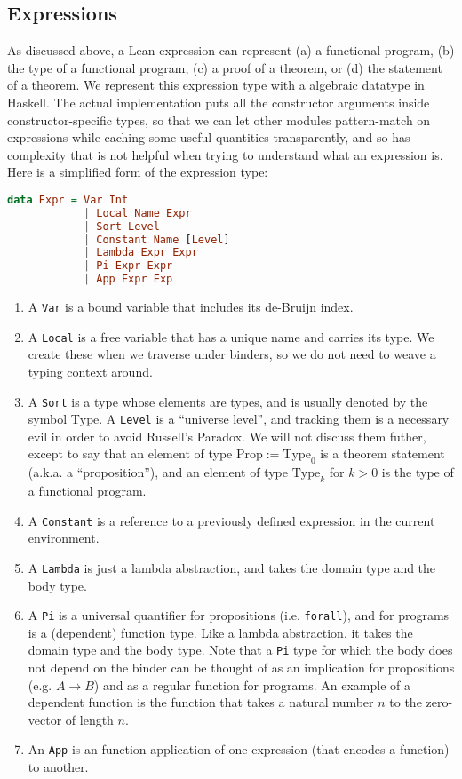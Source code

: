 \documentclass{article}
\begin{document}
\begin{spacing}{1.1}
\subsection{Expressions}
As discussed above, a Lean expression can represent (a) a functional program, (b) the type of a functional program, (c) a proof of a theorem, or (d) the statement of a theorem. We represent this expression type with a algebraic datatype in Haskell. The actual implementation puts all the constructor arguments inside constructor-specific types, so that we can let other modules pattern-match on expressions while caching some useful quantities transparently, and so has complexity that is not helpful when trying to understand what an expression is.  Here is a simplified form of the expression type:
\begin{lstlisting}[language=Haskell]
  data Expr = Var Int
            | Local Name Expr
            | Sort Level
            | Constant Name [Level]
            | Lambda Expr Expr
            | Pi Expr Expr
            | App Expr Exp
\end{lstlisting}
\begin{enumerate}
  \item A \lstinline{Var} is a bound variable that includes its de-Bruijn index.
  \item A \lstinline{Local} is a free variable that has a unique name and carries its type. We create these when we traverse under binders, so we do not need to weave a typing context around.
  \item A \lstinline{Sort} is a type whose elements are types, and is usually denoted by the symbol \( \mathrm{Type} \). A \lstinline{Level} is a ``universe level'', and tracking them is a necessary evil in order to avoid Russell's Paradox. We will not discuss them futher, except to say that an element of type \( \mathrm{Prop} := \mathrm{Type}_0 \) is a theorem statement (a.k.a. a ``proposition''), and an element of type \( \mathrm{Type}_k \) for \( k > 0 \) is the type of a functional program.
  \item A \lstinline{Constant} is a reference to a previously defined expression in the current environment.
  \item A \lstinline{Lambda} is just a lambda abstraction, and takes the domain type and the body type.
  \item A \lstinline{Pi} is a universal quantifier for propositions (i.e. \lstinline{forall}), and for programs is a (dependent) function type. Like a lambda abstraction, it takes the domain type and the body type. Note that a \lstinline{Pi} type for which the body does not depend on the binder can be thought of as an implication for propositions (e.g. \( A \to B \)) and as a regular function for programs. An example of a dependent function is the function that takes a natural number \( n \) to the zero-vector of length \( n \).
  \item An \lstinline{App} is an function application of one expression (that encodes a function) to another.
\end{enumerate}


\end{spacing}
\end{document}
